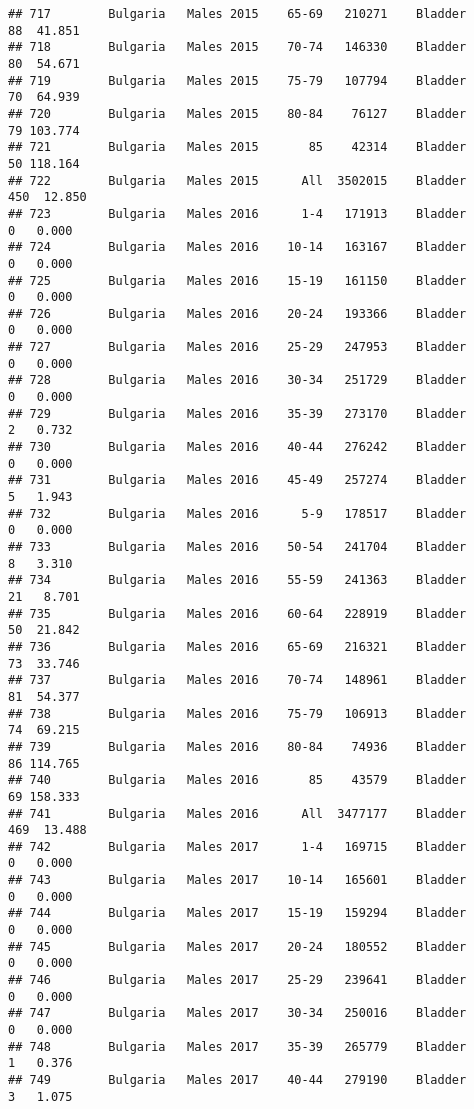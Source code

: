 \documentclass[
]{article}
\begin{document}
\begin{verbatim}
## 717        Bulgaria   Males 2015    65-69   210271    Bladder     88  41.851
## 718        Bulgaria   Males 2015    70-74   146330    Bladder     80  54.671
## 719        Bulgaria   Males 2015    75-79   107794    Bladder     70  64.939
## 720        Bulgaria   Males 2015    80-84    76127    Bladder     79 103.774
## 721        Bulgaria   Males 2015       85    42314    Bladder     50 118.164
## 722        Bulgaria   Males 2015      All  3502015    Bladder    450  12.850
## 723        Bulgaria   Males 2016      1-4   171913    Bladder      0   0.000
## 724        Bulgaria   Males 2016    10-14   163167    Bladder      0   0.000
## 725        Bulgaria   Males 2016    15-19   161150    Bladder      0   0.000
## 726        Bulgaria   Males 2016    20-24   193366    Bladder      0   0.000
## 727        Bulgaria   Males 2016    25-29   247953    Bladder      0   0.000
## 728        Bulgaria   Males 2016    30-34   251729    Bladder      0   0.000
## 729        Bulgaria   Males 2016    35-39   273170    Bladder      2   0.732
## 730        Bulgaria   Males 2016    40-44   276242    Bladder      0   0.000
## 731        Bulgaria   Males 2016    45-49   257274    Bladder      5   1.943
## 732        Bulgaria   Males 2016      5-9   178517    Bladder      0   0.000
## 733        Bulgaria   Males 2016    50-54   241704    Bladder      8   3.310
## 734        Bulgaria   Males 2016    55-59   241363    Bladder     21   8.701
## 735        Bulgaria   Males 2016    60-64   228919    Bladder     50  21.842
## 736        Bulgaria   Males 2016    65-69   216321    Bladder     73  33.746
## 737        Bulgaria   Males 2016    70-74   148961    Bladder     81  54.377
## 738        Bulgaria   Males 2016    75-79   106913    Bladder     74  69.215
## 739        Bulgaria   Males 2016    80-84    74936    Bladder     86 114.765
## 740        Bulgaria   Males 2016       85    43579    Bladder     69 158.333
## 741        Bulgaria   Males 2016      All  3477177    Bladder    469  13.488
## 742        Bulgaria   Males 2017      1-4   169715    Bladder      0   0.000
## 743        Bulgaria   Males 2017    10-14   165601    Bladder      0   0.000
## 744        Bulgaria   Males 2017    15-19   159294    Bladder      0   0.000
## 745        Bulgaria   Males 2017    20-24   180552    Bladder      0   0.000
## 746        Bulgaria   Males 2017    25-29   239641    Bladder      0   0.000
## 747        Bulgaria   Males 2017    30-34   250016    Bladder      0   0.000
## 748        Bulgaria   Males 2017    35-39   265779    Bladder      1   0.376
## 749        Bulgaria   Males 2017    40-44   279190    Bladder      3   1.075

\end{verbatim}
\end{document}
